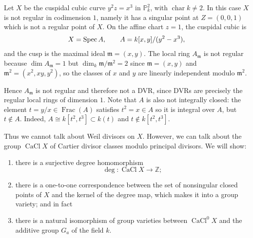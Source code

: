 \documentclass[12pt]{article}
\begin{document}
\begin{example}
    Let $X$ be the cuspidal cubic curve $y^2z = x^3$ in $\mathbb{P}^2_k$, with $\operatorname{char} k \neq 2$. In this case $X$ is not regular in codimension $1$, namely it has a singular point at $Z=(0,0,1)$ which is not a regular point of $X$. On the affine chart $z=1$, the cuspidal cubic is
    \[
        X=\operatorname{Spec} A,\qquad A=k[x,y]/(y^2-x^3),
    \]
    and the cusp is the maximal ideal $\mathfrak m=(x,y)$. The local ring $A_{\mathfrak m}$ is not regular because $\dim A_{\mathfrak m}=1$
    but $\dim_k \mathfrak m/\mathfrak m^2=2$
    since $\mathfrak m=(x,y)$ and $\mathfrak m^2=(x^2,xy,y^2)$, so the classes of $x$ and $y$ are linearly independent modulo $\mathfrak m^2$.

    Hence $A_{\mathfrak m}$ is not regular and therefore not a DVR, since DVRs are precisely the regular local rings of dimension $1$. Note that $A$ is also not integrally closed: the element $t=y/x \in \operatorname{Frac}(A)$
    satisfies $t^2=x \in A$ so it is integral over $A$, but $t\notin A$. Indeed, $A \cong k[t^2,t^3]\subset k(t)$ and $t\notin k[t^2,t^3]$.

    Thus we cannot talk about Weil divisors on $X$. However, we can talk about the group $\operatorname{CaCl} X$ of Cartier divisor classes modulo principal divisors. We will show:
    \begin{enumerate}
        \item[(a)] there is a surjective degree homomorphism
              \[
                  \deg : \operatorname{CaCl} X \to \mathbb{Z};
              \]
        \item[(b)] there is a one-to-one correspondence between the set of nonsingular closed points of $X$ and the kernel of the degree map, which makes it into a group variety; and in fact
        \item[(c)] there is a natural isomorphism of group varieties between $\operatorname{CaCl}^0 X$ and the additive group $G_a$ of the field $k$.
    \end{enumerate}


\end{example}
\end{document}
